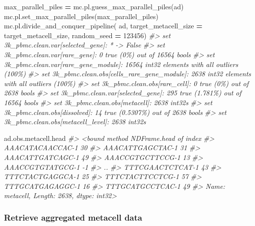 \documentclass[
]{book}
\newenvironment{Shaded}{\begin{snugshade}}{\end{snugshade}}
\newcommand{\CommentTok}[1]{\textcolor[rgb]{0.56,0.35,0.01}{\textit{#1}}}
\newcommand{\DecValTok}[1]{\textcolor[rgb]{0.00,0.00,0.81}{#1}}
\newcommand{\NormalTok}[1]{#1}
\newcommand{\OperatorTok}[1]{\textcolor[rgb]{0.81,0.36,0.00}{\textbf{#1}}}
\begin{document}
\begin{Shaded}
\begin{Highlighting}[]
\NormalTok{max\_parallel\_piles }\OperatorTok{=}\NormalTok{ mc.pl.guess\_max\_parallel\_piles(ad)}
\NormalTok{mc.pl.set\_max\_parallel\_piles(max\_parallel\_piles)}
\NormalTok{mc.pl.divide\_and\_conquer\_pipeline(}
\NormalTok{    ad,}
\NormalTok{    target\_metacell\_size }\OperatorTok{=}\NormalTok{ target\_metacell\_size,}
\NormalTok{    random\_seed }\OperatorTok{=} \DecValTok{123456}\NormalTok{)}
\CommentTok{\#\textgreater{} set 3k\_pbmc.clean.var[selected\_gene]: * {-}\textgreater{} False}
\CommentTok{\#\textgreater{} set 3k\_pbmc.clean.var[rare\_gene]: 0 true (0\%) out of 16564 bools}
\CommentTok{\#\textgreater{} set 3k\_pbmc.clean.var[rare\_gene\_module]: 16564 int32 elements with all outliers (100\%)}
\CommentTok{\#\textgreater{} set 3k\_pbmc.clean.obs[cells\_rare\_gene\_module]: 2638 int32 elements with all outliers (100\%)}
\CommentTok{\#\textgreater{} set 3k\_pbmc.clean.obs[rare\_cell]: 0 true (0\%) out of 2638 bools}
\CommentTok{\#\textgreater{} set 3k\_pbmc.clean.var[selected\_gene]: 295 true (1.781\%) out of 16564 bools}
\CommentTok{\#\textgreater{} set 3k\_pbmc.clean.obs[metacell]: 2638 int32s}
\CommentTok{\#\textgreater{} set 3k\_pbmc.clean.obs[dissolved]: 14 true (0.5307\%) out of 2638 bools}
\CommentTok{\#\textgreater{} set 3k\_pbmc.clean.obs[metacell\_level]: 2638 int32s}

\NormalTok{ad.obs.metacell.head}
\CommentTok{\#\textgreater{} \textless{}bound method NDFrame.head of index}
\CommentTok{\#\textgreater{} AAACATACAACCAC{-}1    30}
\CommentTok{\#\textgreater{} AAACATTGAGCTAC{-}1    31}
\CommentTok{\#\textgreater{} AAACATTGATCAGC{-}1    49}
\CommentTok{\#\textgreater{} AAACCGTGCTTCCG{-}1    13}
\CommentTok{\#\textgreater{} AAACCGTGTATGCG{-}1    {-}1}
\CommentTok{\#\textgreater{}                     ..}
\CommentTok{\#\textgreater{} TTTCGAACTCTCAT{-}1    43}
\CommentTok{\#\textgreater{} TTTCTACTGAGGCA{-}1    25}
\CommentTok{\#\textgreater{} TTTCTACTTCCTCG{-}1    57}
\CommentTok{\#\textgreater{} TTTGCATGAGAGGC{-}1    16}
\CommentTok{\#\textgreater{} TTTGCATGCCTCAC{-}1    49}
\CommentTok{\#\textgreater{} Name: metacell, Length: 2638, dtype: int32\textgreater{}}
\end{Highlighting}
\end{Shaded}

\hypertarget{retrieve-aggregated-metacell-data}{%
\subsubsection*{Retrieve aggregated metacell data}\label{retrieve-aggregated-metacell-data}}
\end{document}
